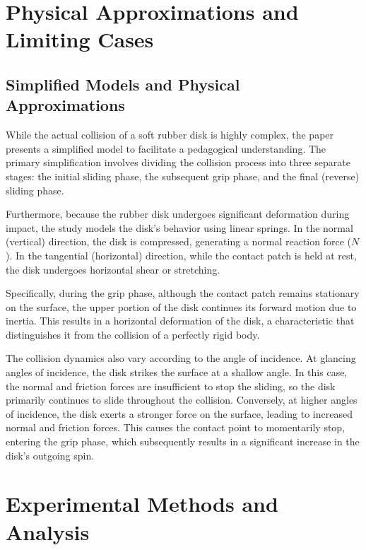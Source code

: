 \documentclass[11pt,letterpaper]{article}
\begin{document}
\section{Physical Approximations and Limiting Cases}

\subsection{Simplified Models and Physical Approximations}
While the actual collision of a soft rubber disk is highly complex, the paper presents a simplified model to facilitate a pedagogical understanding. The primary simplification involves dividing the collision process into three separate stages: the initial sliding phase, the subsequent grip phase, and the final (reverse) sliding phase.

\noindent Furthermore, because the rubber disk undergoes significant deformation during impact, the study models the disk's behavior using linear springs. In the normal (vertical) direction, the disk is compressed, generating a normal reaction force ($N$). In the tangential (horizontal) direction, while the contact patch is held at rest, the disk undergoes horizontal shear or stretching.

\noindent Specifically, during the grip phase, although the contact patch remains stationary on the surface, the upper portion of the disk continues its forward motion due to inertia. This results in a horizontal deformation of the disk, a characteristic that distinguishes it from the collision of a perfectly rigid body.

\noindent The collision dynamics also vary according to the angle of incidence. At glancing angles of incidence, the disk strikes the surface at a shallow angle. In this case, the normal and friction forces are insufficient to stop the sliding, so the disk primarily continues to slide throughout the collision. Conversely, at higher angles of incidence, the disk exerts a stronger force on the surface, leading to increased normal and friction forces. This causes the contact point to momentarily stop, entering the grip phase, which subsequently results in a significant increase in the disk's outgoing spin.

\section{Experimental Methods and Analysis}
\end{document}
